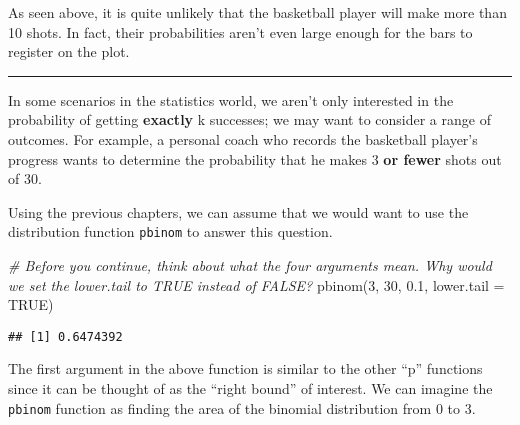 \documentclass[
]{article}
\newenvironment{Shaded}{\begin{snugshade}}{\end{snugshade}}
\newcommand{\AttributeTok}[1]{\textcolor[rgb]{0.77,0.63,0.00}{#1}}
\newcommand{\CommentTok}[1]{\textcolor[rgb]{0.56,0.35,0.01}{\textit{#1}}}
\newcommand{\ConstantTok}[1]{\textcolor[rgb]{0.00,0.00,0.00}{#1}}
\newcommand{\DecValTok}[1]{\textcolor[rgb]{0.00,0.00,0.81}{#1}}
\newcommand{\FloatTok}[1]{\textcolor[rgb]{0.00,0.00,0.81}{#1}}
\newcommand{\FunctionTok}[1]{\textcolor[rgb]{0.00,0.00,0.00}{#1}}
\newcommand{\NormalTok}[1]{#1}
\newcommand{\SpecialCharTok}[1]{\textcolor[rgb]{0.00,0.00,0.00}{#1}}
\newcommand{\StringTok}[1]{\textcolor[rgb]{0.31,0.60,0.02}{#1}}
\begin{document}
As seen above, it is quite unlikely that the basketball player will make more than 10 shots. In fact, their probabilities aren't even large enough for the bars to register on the plot.

\begin{center}\rule{0.5\linewidth}{0.5pt}\end{center}

In some scenarios in the statistics world, we aren't only interested in the probability of getting \textbf{exactly} k successes; we may want to consider a range of outcomes. For example, a personal coach who records the basketball player's progress wants to determine the probability that he makes 3 \textbf{or fewer} shots out of 30.

Using the previous chapters, we can assume that we would want to use the distribution function \texttt{pbinom} to answer this question.

\begin{Shaded}
\begin{Highlighting}[]
\CommentTok{\# Before you continue, think about what the four arguments mean. Why would we set the lower.tail to TRUE instead of FALSE?}
\FunctionTok{pbinom}\NormalTok{(}\DecValTok{3}\NormalTok{, }\DecValTok{30}\NormalTok{, }\FloatTok{0.1}\NormalTok{, }\AttributeTok{lower.tail =} \ConstantTok{TRUE}\NormalTok{)}
\end{Highlighting}
\end{Shaded}

\begin{verbatim}
## [1] 0.6474392
\end{verbatim}

The first argument in the above function is similar to the other ``p'' functions since it can be thought of as the ``right bound'' of interest. We can imagine the \texttt{pbinom} function as finding the area of the binomial distribution from 0 to 3.

\begin{Shaded}
\end{Shaded}
\end{document}
